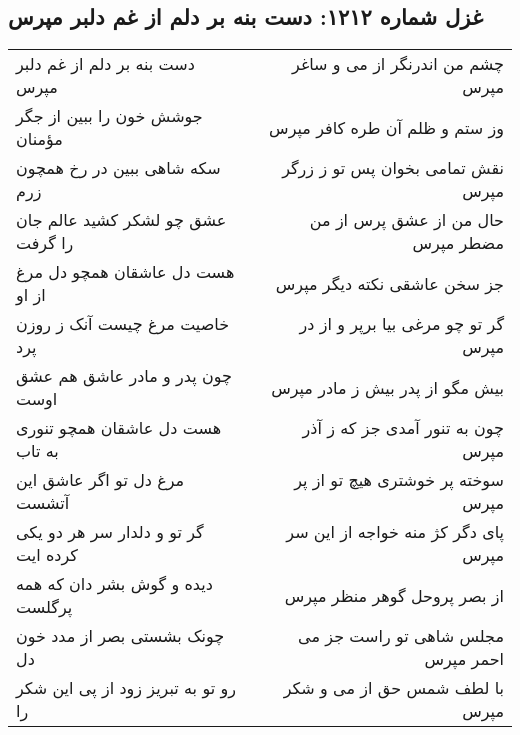 \begin{center}
\section*{غزل شماره ۱۲۱۲: دست بنه بر دلم از غم دلبر مپرس}
\label{sec:1212}
\begin{longtable}{l p{0.5cm} r}
دست بنه بر دلم از غم دلبر مپرس
&&
چشم من اندرنگر از می و ساغر مپرس
\\
جوشش خون را ببین از جگر مؤمنان
&&
وز ستم و ظلم آن طره کافر مپرس
\\
سکه شاهی ببین در رخ همچون زرم
&&
نقش تمامی بخوان پس تو ز زرگر مپرس
\\
عشق چو لشکر کشید عالم جان را گرفت
&&
حال من از عشق پرس از من مضطر مپرس
\\
هست دل عاشقان همچو دل مرغ از او
&&
جز سخن عاشقی نکته دیگر مپرس
\\
خاصیت مرغ چیست آنک ز روزن پرد
&&
گر تو چو مرغی بیا برپر و از در مپرس
\\
چون پدر و مادر عاشق هم عشق اوست
&&
بیش مگو از پدر بیش ز مادر مپرس
\\
هست دل عاشقان همچو تنوری به تاب
&&
چون به تنور آمدی جز که ز آذر مپرس
\\
مرغ دل تو اگر عاشق این آتشست
&&
سوخته پر خوشتری هیچ تو از پر مپرس
\\
گر تو و دلدار سر هر دو یکی کرده ایت
&&
پای دگر کژ منه خواجه از این سر مپرس
\\
دیده و گوش بشر دان که همه پرگلست
&&
از بصر پروحل گوهر منظر مپرس
\\
چونک بشستی بصر از مدد خون دل
&&
مجلس شاهی تو راست جز می احمر مپرس
\\
رو تو به تبریز زود از پی این شکر را
&&
با لطف شمس حق از می و شکر مپرس
\\
\end{longtable}
\end{center}
